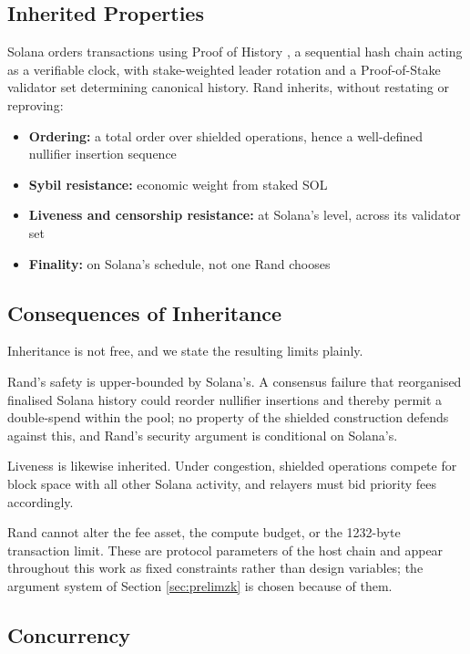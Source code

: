 \documentclass[11pt,a4paper]{article}
\begin{document}
\subsection{Inherited Properties}

Solana orders transactions using Proof of History \cite{Yakovenko2018}, a sequential hash chain acting as a verifiable clock, with stake-weighted leader rotation and a Proof-of-Stake validator set determining canonical history. Rand inherits, without restating or reproving:

\begin{itemize}
    \item \textbf{Ordering:} a total order over shielded operations, hence a well-defined nullifier insertion sequence
    \item \textbf{Sybil resistance:} economic weight from staked SOL
    \item \textbf{Liveness and censorship resistance:} at Solana's level, across its validator set
    \item \textbf{Finality:} on Solana's schedule, not one Rand chooses
\end{itemize}

\subsection{Consequences of Inheritance}

Inheritance is not free, and we state the resulting limits plainly.

Rand's safety is upper-bounded by Solana's. A consensus failure that reorganised finalised Solana history could reorder nullifier insertions and thereby permit a double-spend within the pool; no property of the shielded construction defends against this, and Rand's security argument is conditional on Solana's.

Liveness is likewise inherited. Under congestion, shielded operations compete for block space with all other Solana activity, and relayers must bid priority fees accordingly.

Rand cannot alter the fee asset, the compute budget, or the 1232-byte transaction limit. These are protocol parameters of the host chain and appear throughout this work as fixed constraints rather than design variables; the argument system of Section \ref{sec:prelimzk} is chosen because of them.

\subsection{Concurrency}
\label{sec:concurrency}
\end{document}
